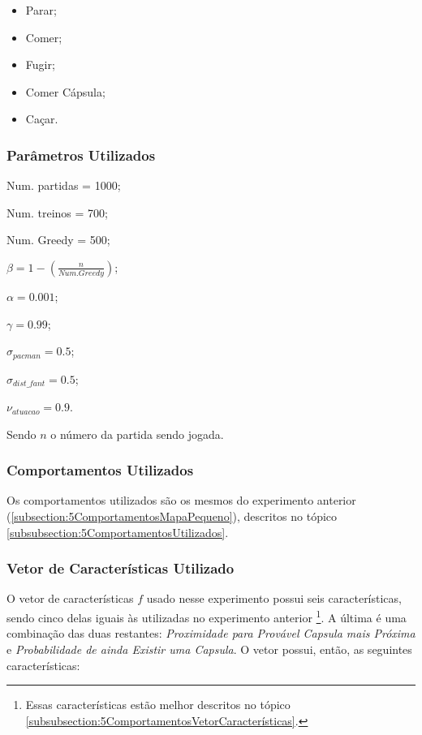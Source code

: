 \begin{itemize}
	\item Parar;
	\item Comer;
	\item Fugir;
	\item Comer Cápsula;
	\item Caçar.
\end{itemize}

\subsubsection{Parâmetros Utilizados}

\begin{multicols}{2}

Num. partidas = 1000;

Num. treinos = 700;

Num. Greedy = 500;

$ \beta = 1 - \left( \frac{n}{Num. Greedy} \right) $;

$ \alpha = 0.001 $;

$ \gamma = 0.99 $;

$ \sigma_{pacman} = 0.5 $;

$ \sigma_{dist\_fant} = 0.5 $;

$ \nu_{atuacao} = 0.9 $.

\end{multicols}

Sendo $ n $ o número da partida sendo jogada.


\subsubsection{Comportamentos Utilizados}

Os comportamentos utilizados são os mesmos do experimento anterior (\ref{subsection:5ComportamentosMapaPequeno}), descritos no tópico \ref{subsubsection:5ComportamentosUtilizados}.

\subsubsection{Vetor de Características Utilizado}

O vetor de características $ f $ usado nesse experimento possui seis características, sendo cinco delas iguais às utilizadas no experimento anterior%
\footnote{Essas características estão melhor descritos no tópico \ref{subsubsection:5ComportamentosVetorCaracterísticas}.%
}. A última é uma combinação das duas restantes: \textit{Proximidade para Provável Capsula mais Próxima} e \textit{Probabilidade de ainda Existir uma Capsula}.  O vetor possui, então, as seguintes características:

